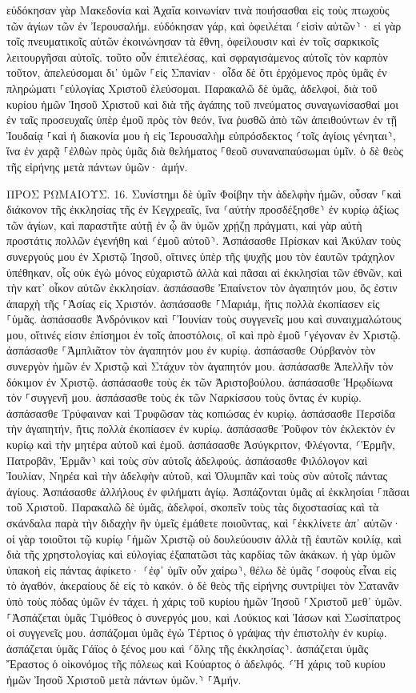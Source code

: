 \documentclass[twoside, 9pt]{extreport}
\begin{document}
εὐδόκησαν γὰρ Μακεδονία καὶ Ἀχαΐα κοινωνίαν τινὰ ποιήσασθαι εἰς τοὺς πτωχοὺς τῶν ἁγίων τῶν ἐν Ἰερουσαλήμ. 
εὐδόκησαν γάρ, καὶ ὀφειλέται ⸂εἰσὶν αὐτῶν⸃· εἰ γὰρ τοῖς πνευματικοῖς αὐτῶν ἐκοινώνησαν τὰ ἔθνη, ὀφείλουσιν καὶ ἐν τοῖς σαρκικοῖς λειτουργῆσαι αὐτοῖς. 
τοῦτο οὖν ἐπιτελέσας, καὶ σφραγισάμενος αὐτοῖς τὸν καρπὸν τοῦτον, ἀπελεύσομαι δι᾽ ὑμῶν ⸀εἰς Σπανίαν· 
οἶδα δὲ ὅτι ἐρχόμενος πρὸς ὑμᾶς ἐν πληρώματι ⸀εὐλογίας Χριστοῦ ἐλεύσομαι. 
Παρακαλῶ δὲ ὑμᾶς, ἀδελφοί, διὰ τοῦ κυρίου ἡμῶν Ἰησοῦ Χριστοῦ καὶ διὰ τῆς ἀγάπης τοῦ πνεύματος συναγωνίσασθαί μοι ἐν ταῖς προσευχαῖς ὑπὲρ ἐμοῦ πρὸς τὸν θεόν, 
ἵνα ῥυσθῶ ἀπὸ τῶν ἀπειθούντων ἐν τῇ Ἰουδαίᾳ ⸀καὶ ἡ διακονία μου ἡ εἰς Ἰερουσαλὴμ εὐπρόσδεκτος ⸂τοῖς ἁγίοις γένηται⸃, 
ἵνα ἐν χαρᾷ ⸀ἐλθὼν πρὸς ὑμᾶς διὰ θελήματος ⸀θεοῦ συναναπαύσωμαι ὑμῖν. 
ὁ δὲ θεὸς τῆς εἰρήνης μετὰ πάντων ὑμῶν· ἀμήν. 

ΠΡΟΣ ΡΩΜΑΙΟΥΣ.
16.
Συνίστημι δὲ ὑμῖν Φοίβην τὴν ἀδελφὴν ἡμῶν, οὖσαν ⸀καὶ διάκονον τῆς ἐκκλησίας τῆς ἐν Κεγχρεαῖς, 
ἵνα ⸂αὐτὴν προσδέξησθε⸃ ἐν κυρίῳ ἀξίως τῶν ἁγίων, καὶ παραστῆτε αὐτῇ ἐν ᾧ ἂν ὑμῶν χρῄζῃ πράγματι, καὶ γὰρ αὐτὴ προστάτις πολλῶν ἐγενήθη καὶ ⸂ἐμοῦ αὐτοῦ⸃. 
Ἀσπάσασθε Πρίσκαν καὶ Ἀκύλαν τοὺς συνεργούς μου ἐν Χριστῷ Ἰησοῦ, 
οἵτινες ὑπὲρ τῆς ψυχῆς μου τὸν ἑαυτῶν τράχηλον ὑπέθηκαν, οἷς οὐκ ἐγὼ μόνος εὐχαριστῶ ἀλλὰ καὶ πᾶσαι αἱ ἐκκλησίαι τῶν ἐθνῶν, 
καὶ τὴν κατ᾽ οἶκον αὐτῶν ἐκκλησίαν. ἀσπάσασθε Ἐπαίνετον τὸν ἀγαπητόν μου, ὅς ἐστιν ἀπαρχὴ τῆς ⸀Ἀσίας εἰς Χριστόν. 
ἀσπάσασθε ⸀Μαριάμ, ἥτις πολλὰ ἐκοπίασεν εἰς ⸀ὑμᾶς. 
ἀσπάσασθε Ἀνδρόνικον καὶ ⸀Ἰουνίαν τοὺς συγγενεῖς μου καὶ συναιχμαλώτους μου, οἵτινές εἰσιν ἐπίσημοι ἐν τοῖς ἀποστόλοις, οἳ καὶ πρὸ ἐμοῦ ⸀γέγοναν ἐν Χριστῷ. 
ἀσπάσασθε ⸀Ἀμπλιᾶτον τὸν ἀγαπητόν μου ἐν κυρίῳ. 
ἀσπάσασθε Οὐρβανὸν τὸν συνεργὸν ἡμῶν ἐν Χριστῷ καὶ Στάχυν τὸν ἀγαπητόν μου. 
ἀσπάσασθε Ἀπελλῆν τὸν δόκιμον ἐν Χριστῷ. ἀσπάσασθε τοὺς ἐκ τῶν Ἀριστοβούλου. 
ἀσπάσασθε Ἡρῳδίωνα τὸν ⸀συγγενῆ μου. ἀσπάσασθε τοὺς ἐκ τῶν Ναρκίσσου τοὺς ὄντας ἐν κυρίῳ. 
ἀσπάσασθε Τρύφαιναν καὶ Τρυφῶσαν τὰς κοπιώσας ἐν κυρίῳ. ἀσπάσασθε Περσίδα τὴν ἀγαπητήν, ἥτις πολλὰ ἐκοπίασεν ἐν κυρίῳ. 
ἀσπάσασθε Ῥοῦφον τὸν ἐκλεκτὸν ἐν κυρίῳ καὶ τὴν μητέρα αὐτοῦ καὶ ἐμοῦ. 
ἀσπάσασθε Ἀσύγκριτον, Φλέγοντα, ⸂Ἑρμῆν, Πατροβᾶν, Ἑρμᾶν⸃ καὶ τοὺς σὺν αὐτοῖς ἀδελφούς. 
ἀσπάσασθε Φιλόλογον καὶ Ἰουλίαν, Νηρέα καὶ τὴν ἀδελφὴν αὐτοῦ, καὶ Ὀλυμπᾶν καὶ τοὺς σὺν αὐτοῖς πάντας ἁγίους. 
Ἀσπάσασθε ἀλλήλους ἐν φιλήματι ἁγίῳ. Ἀσπάζονται ὑμᾶς αἱ ἐκκλησίαι ⸀πᾶσαι τοῦ Χριστοῦ. 
Παρακαλῶ δὲ ὑμᾶς, ἀδελφοί, σκοπεῖν τοὺς τὰς διχοστασίας καὶ τὰ σκάνδαλα παρὰ τὴν διδαχὴν ἣν ὑμεῖς ἐμάθετε ποιοῦντας, καὶ ⸀ἐκκλίνετε ἀπ᾽ αὐτῶν· 
οἱ γὰρ τοιοῦτοι τῷ κυρίῳ ⸀ἡμῶν Χριστῷ οὐ δουλεύουσιν ἀλλὰ τῇ ἑαυτῶν κοιλίᾳ, καὶ διὰ τῆς χρηστολογίας καὶ εὐλογίας ἐξαπατῶσι τὰς καρδίας τῶν ἀκάκων. 
ἡ γὰρ ὑμῶν ὑπακοὴ εἰς πάντας ἀφίκετο· ⸂ἐφ᾽ ὑμῖν οὖν χαίρω⸃, θέλω δὲ ὑμᾶς ⸀σοφοὺς εἶναι εἰς τὸ ἀγαθόν, ἀκεραίους δὲ εἰς τὸ κακόν. 
ὁ δὲ θεὸς τῆς εἰρήνης συντρίψει τὸν Σατανᾶν ὑπὸ τοὺς πόδας ὑμῶν ἐν τάχει. ἡ χάρις τοῦ κυρίου ἡμῶν Ἰησοῦ ⸀Χριστοῦ μεθ᾽ ὑμῶν. 
⸀Ἀσπάζεται ὑμᾶς Τιμόθεος ὁ συνεργός μου, καὶ Λούκιος καὶ Ἰάσων καὶ Σωσίπατρος οἱ συγγενεῖς μου. 
ἀσπάζομαι ὑμᾶς ἐγὼ Τέρτιος ὁ γράψας τὴν ἐπιστολὴν ἐν κυρίῳ. 
ἀσπάζεται ὑμᾶς Γάϊος ὁ ξένος μου καὶ ⸂ὅλης τῆς ἐκκλησίας⸃. ἀσπάζεται ὑμᾶς Ἔραστος ὁ οἰκονόμος τῆς πόλεως καὶ Κούαρτος ὁ ἀδελφός. 
⸂Ἡ χάρις τοῦ κυρίου ἡμῶν Ἰησοῦ Χριστοῦ μετὰ πάντων ὑμῶν.⸃ ⸀Ἀμήν. 
\end{document}
